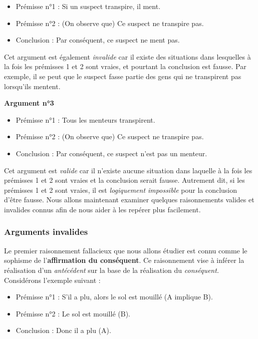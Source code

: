 \documentclass[
  a4paper,11pt,twoside,onecolumn,openright,final,oldfontcommands]{memoir}
\providecommand{\tightlist}{%
  \setlength{\itemsep}{0pt}\setlength{\parskip}{0pt}}
\theoremstyle{definition}
\theoremstyle{definition}
\theoremstyle{definition}
\theoremstyle{remark}
\begin{document}
\begin{itemize}
\tightlist
\item
  Prémisse n°1 : Si un suspect transpire, il ment.
\item
  Prémisse n°2 : (On observe que) Ce suspect ne transpire pas.
\item
  Conclusion : Par conséquent, ce suspect ne ment pas.
\end{itemize}

Cet argument est également \emph{invalide} car il existe des situations dans lesquelles à la fois les prémisses 1 et 2 sont vraies, et pourtant la conclusion est fausse. Par exemple, il se peut que le suspect fasse partie des gens qui ne transpirent pas lorsqu'ils mentent.

\textbf{Argument n°3}

\begin{itemize}
\tightlist
\item
  Prémisse n°1 : Tous les menteurs transpirent.
\item
  Prémisse n°2 : (On observe que) Ce suspect ne transpire pas.
\item
  Conclusion : Par conséquent, ce suspect n'est pas un menteur.
\end{itemize}

Cet argument est \emph{valide} car il n'existe aucune situation dans laquelle à la fois les prémisses 1 et 2 sont vraies et la conclusion serait fausse. Autrement dit, si les prémisses 1 et 2 sont vraies, il est \emph{logiquement impossible} pour la conclusion d'être fausse. Nous allons maintenant examiner quelques raisonnements valides et invalides connus afin de nous aider à les repérer plus facilement.

\hypertarget{arguments-invalides}{%
\subsubsection{Arguments invalides}\label{arguments-invalides}}

Le premier raisonnement fallacieux que nous allons étudier est connu comme le sophisme de l'\textbf{affirmation du conséquent}. Ce raisonnement vise à inférer la réalisation d'un \emph{antécédent} sur la base de la réalisation du \emph{conséquent.} Considérons l'exemple suivant :

\begin{itemize}
\tightlist
\item
  Prémisse n°1 : S'il a plu, alors le sol est mouillé (A implique B).
\item
  Prémisse n°2 : Le sol est mouillé (B).
\item
  Conclusion : Donc il a plu (A).
\end{itemize}
\end{document}
